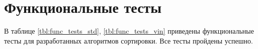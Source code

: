 
\clearpage


\clearpage


\clearpage



\clearpage



\section{Функциональные тесты}

В таблице \ref{tbl:func_tests_std}, \ref{tbl:func_tests_vin} приведены функциональные тесты для разработанных алгоритмов сортировки. Все тесты пройдены успешно.

\clearpage

